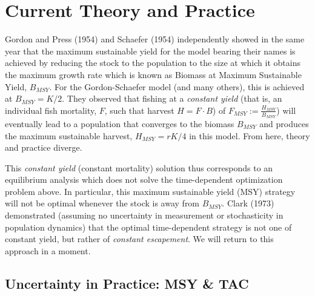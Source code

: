 \documentclass[3p]{elsarticle} %
\begin{document}
\hypertarget{current-theory-and-practice}{%
\section{Current Theory and
Practice}\label{current-theory-and-practice}}

Gordon and Press (1954) and Schaefer (1954) independently showed in the
same year that the maximum sustainable yield for the model bearing their
names is achieved by reducing the stock to the population to the size at
which it obtains the maximum growth rate which is known as Biomass at
Maximum Sustainable Yield, \(B_{MSY}\). For the Gordon-Schaefer model
(and many others), this is achieved at \(B_{MSY} = K/2\). They observed
that fishing at a \emph{constant yield} (that is, an individual fish
mortality, \(F\), such that harvest \(H = F \cdot B\)) of
\(F_{MSY} := \tfrac{H_{MSY}}{B_{MSY}}\)) will eventually lead to a
population that converges to the biomass \(B_{MSY}\) and produces the
maximum sustainable harvest, \(H_{MSY} = r K / 4\) in this model. From
here, theory and practice diverge.

This \emph{constant yield} (constant mortality) solution thus
corresponds to an equilibrium analysis which does not solve the
time-dependent optimization problem above. In particular, this maximum
sustainable yield (MSY) strategy will not be optimal whenever the stock
is away from \(B_{MSY}\). Clark (1973) demonstrated (assuming no
uncertainty in measurement or stochasticity in population dynamics) that
the optimal time-dependent strategy is not one of constant yield, but
rather of \emph{constant escapement}. We will return to this approach in
a moment.

\hypertarget{uncertainty-in-practice-msy-tac}{%
\subsection{Uncertainty in Practice: MSY \&
TAC}\label{uncertainty-in-practice-msy-tac}}
\end{document}
